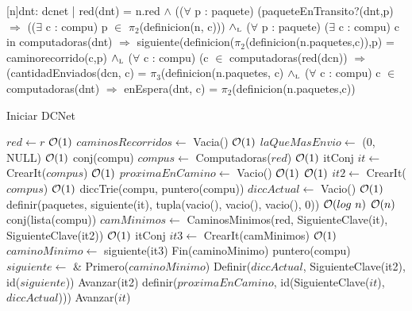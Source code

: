 \begin{Representacion}
 
  [n]{dnt: dcnet | red(dnt) = n.red  $\land$ (($\forall$ p : paquete) (paqueteEnTransito?(dnt,p) $\Rightarrow$ (($\exists$ c : compu) p $\in$ $\pi_2$(definicion(n, c))) $\land_{\mathrm{\scriptscriptstyle{L}}}$
 ($\forall$ p : paquete) ($\exists$ c : compu) c in computadoras(dnt) $\Rightarrow$ siguiente(definicion($\pi_2$(definicion(n.paquetes,c)),p) = caminorecorrido(c,p)  $\land_{\mathrm{\scriptscriptstyle{L}}}$
($\forall$ c : compu) (c $\in$ computadoras(red(dcn)) $\Rightarrow$ (cantidadEnviados(dcn, c) = $\pi_3$(definicion(n.paquetes, c) $\land_{\mathrm{\scriptscriptstyle{L}}}$ 
($\forall$ c : compu) c $\in$ computadoras(dnt) $\Rightarrow$ enEspera(dnt, c) = $\pi_2$(definicion(n.paquetes,c))}

\end{Representacion}



\begin{Algoritmos}


\begin{algorithm}
\caption{Iniciar DCNet}
\begin{algorithmic}[1]
  \State $red \gets r$ \Comment $\mathcal{O}(1)$
  \State $caminosRecorridos \gets$ Vacia() \Comment $\mathcal{O}(1)$ 
  \State $laQueMasEnvio \gets$ (0, NULL) \Comment $\mathcal{O}(1)$
  \State conj(compu) $compus \gets$ Computadoras($red$) \Comment $\mathcal{O}(1)$
   \State itConj $it \gets$ CrearIt($compus$) \Comment $\mathcal{O}(1)$
  \State $proximaEnCamino \gets$ Vacio() \Comment $\mathcal{O}(1)$
   \Comment $\mathcal{O}(1)$
    \State {} $it2 \gets$ CrearIt($compus$) \Comment $\mathcal{O}(1)$
    \State diccTrie(compu, puntero(compu)) $diccActual \gets$ Vacio() \Comment $\mathcal{O}(1)$
	\State definir(paquetes, siguiente(it), tupla(vacio(), vacio(), vacio(), 0)) \Comment $\mathcal{O}(log \ n)$
     \Comment $\mathcal{O}(n)$
      \State conj(lista(compu)) $camMinimos \gets$ CaminosMinimos(red, SiguienteClave(it), SiguienteClave(it2)) \Comment $\mathcal{O}(1)$
      \State itConj $it3 \gets$ CrearIt(camMinimos) \Comment $\mathcal{O}(1)$
      \State $caminoMinimo \gets$ siguiente(it3)
      \State Fin(caminoMinimo)
      \State puntero(compu) $siguiente \gets$ \& Primero($caminoMinimo$)
      \State Definir($diccActual$, SiguienteClave(it2), id($siguiente$))
      \State Avanzar(it2)            
    \EndWhile
    \State definir($proximaEnCamino$, id(SiguienteClave($it$), $diccActual$)))
    \State Avanzar($it$)
  \EndWhile
   
  \EndProcedure
\end{algorithmic}
\end{algorithm}



\end{Algoritmos}
